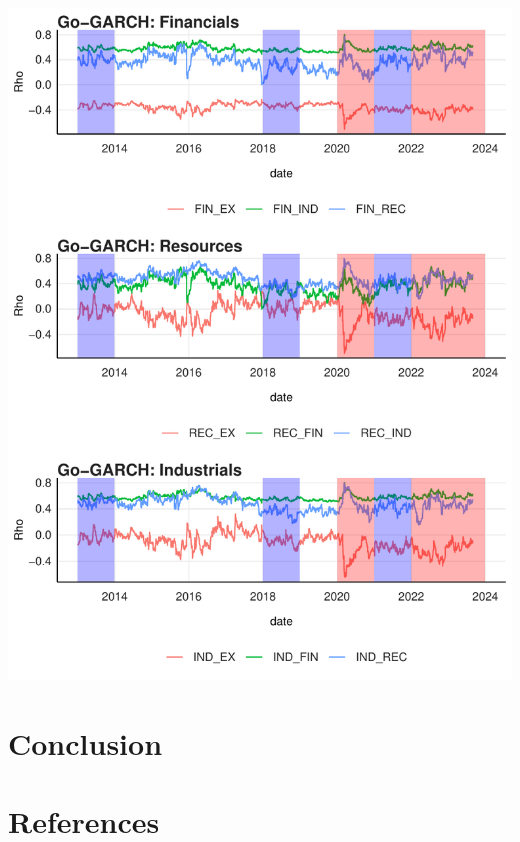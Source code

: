 \documentclass[11pt,preprint, authoryear]{elsarticle}
\let\origfigure\figure
\let\endorigfigure\endfigure
\renewenvironment{figure}[1][2] {
    \expandafter\origfigure\expandafter[H]
} {
    \endorigfigure
}
\numberwithin{equation}{section}
\numberwithin{figure}{section}
\numberwithin{table}{section}
\begin{document}
\begin{figure}[H]

{\centering \includegraphics{WriteUp_files/figure-latex/Figure4-1} 

}

\caption{GO-GARCH  \label{Figure4}}\label{fig:Figure4}
\end{figure}

\hypertarget{conclusion}{%
\section{Conclusion}\label{conclusion}}

\newpage

\hypertarget{references}{%
\section*{References}\label{references}}
\end{document}
